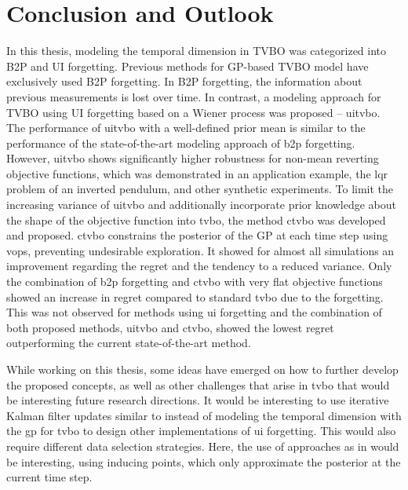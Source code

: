 \chapter{Conclusion and Outlook}
\label{chap:conclusion}

In this thesis, modeling the temporal dimension in TVBO was categorized into B2P and UI forgetting. Previous methods for GP-based TVBO model have exclusively used B2P forgetting. In B2P forgetting, the information about previous measurements is lost over time. In contrast, a modeling approach for TVBO using UI forgetting based on a Wiener process was proposed -- \gls{uitvbo}. The performance of \gls{uitvbo} with a well-defined prior mean is similar to the performance of the state-of-the-art modeling approach of \gls{b2p} forgetting. However, \gls{uitvbo} shows significantly higher robustness for non-mean reverting objective functions, which was demonstrated in an application example, the \gls{lqr} problem of an inverted pendulum, and other synthetic experiments. 
To limit the increasing variance of \gls{uitvbo} and additionally incorporate prior knowledge about the shape of the objective function into \gls{tvbo}, the method \gls{ctvbo} was developed and proposed. \gls{ctvbo} constrains the posterior of the GP at each time step using \glspl{vop}, preventing undesirable exploration. It showed for almost all simulations an improvement regarding the regret and the tendency to a reduced variance. Only the combination of \gls{b2p} forgetting and \gls{ctvbo} with very flat objective functions showed an increase in regret compared to standard \gls{tvbo} due to the forgetting. This was not observed for methods using \gls{ui} forgetting and the combination of both proposed methods, \gls{uitvbo} and \gls{ctvbo}, showed the lowest regret outperforming the current state-of-the-art method.

While working on this thesis, some ideas have emerged on how to further develop the proposed concepts, as well as other challenges that arise in \gls{tvbo} that would be interesting future research directions. It would be interesting to use iterative Kalman filter updates similar to \textcite{Carron_2016} instead of modeling the temporal dimension with the \gls{gp} for \gls{tvbo} to design other implementations of \gls{ui} forgetting. This would also require different data selection strategies. Here, the use of approaches as in \textcite{Titsias_2009} would be interesting, using inducing points, which only approximate the posterior at the current time step.

